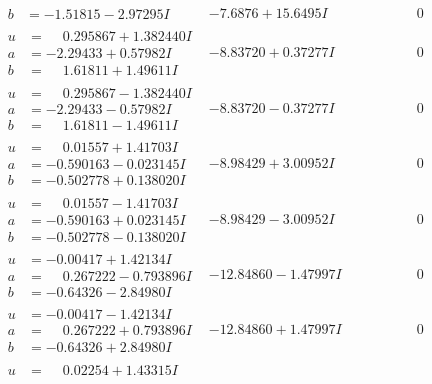 \documentclass[1p]{elsarticle_modified}
\theoremstyle{definition}
\begin{document}
$$\begin{array}{c|c|c}
\begin{aligned}
b &= -1.51815 - 2.97295 I\end{aligned}
 & -7.6876 + 15.6495 I & \phantom{-0.000000 } 0 \\ \hline\begin{aligned}
u &= \phantom{-}0.295867 + 1.382440 I \\
a &= -2.29433 + 0.57982 I \\
b &= \phantom{-}1.61811 + 1.49611 I\end{aligned}
 & -8.83720 + 0.37277 I & \phantom{-0.000000 } 0 \\ \hline\begin{aligned}
u &= \phantom{-}0.295867 - 1.382440 I \\
a &= -2.29433 - 0.57982 I \\
b &= \phantom{-}1.61811 - 1.49611 I\end{aligned}
 & -8.83720 - 0.37277 I & \phantom{-0.000000 } 0 \\ \hline\begin{aligned}
u &= \phantom{-}0.01557 + 1.41703 I \\
a &= -0.590163 - 0.023145 I \\
b &= -0.502778 + 0.138020 I\end{aligned}
 & -8.98429 + 3.00952 I & \phantom{-0.000000 } 0 \\ \hline\begin{aligned}
u &= \phantom{-}0.01557 - 1.41703 I \\
a &= -0.590163 + 0.023145 I \\
b &= -0.502778 - 0.138020 I\end{aligned}
 & -8.98429 - 3.00952 I & \phantom{-0.000000 } 0 \\ \hline\begin{aligned}
u &= -0.00417 + 1.42134 I \\
a &= \phantom{-}0.267222 - 0.793896 I \\
b &= -0.64326 - 2.84980 I\end{aligned}
 & -12.84860 - 1.47997 I & \phantom{-0.000000 } 0 \\ \hline\begin{aligned}
u &= -0.00417 - 1.42134 I \\
a &= \phantom{-}0.267222 + 0.793896 I \\
b &= -0.64326 + 2.84980 I\end{aligned}
 & -12.84860 + 1.47997 I & \phantom{-0.000000 } 0 \\ \hline\begin{aligned}
u &= \phantom{-}0.02254 + 1.43315 I \\

\end{aligned}
\end{array}$$
\end{document}
